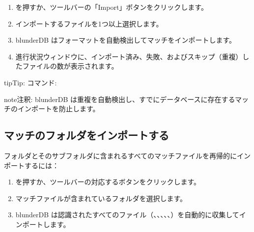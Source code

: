 \documentclass[letterpaper,10pt,dvipdfmx]{sphinxmanual}
\begin{document}
\sphinxAtStartPar
{}
\begin{enumerate}
%
\item {} 
\sphinxAtStartPar
{} を押すか、ツールバーの「Import」ボタンをクリックします。

\item {} 
\sphinxAtStartPar
インポートするファイルを1つ以上選択します。

\item {} 
\sphinxAtStartPar
blunderDB はフォーマットを自動検出してマッチをインポートします。

\item {} 
\sphinxAtStartPar
進行状況ウィンドウに、インポート済み、失敗、およびスキップ（重複）したファイルの数が表示されます。

\end{enumerate}

\begin{sphinxadmonition}{tip}{Tip:}
\sphinxAtStartPar
コマンド: 
\end{sphinxadmonition}

\begin{sphinxadmonition}{note}{注釈:}
\sphinxAtStartPar
blunderDB は重複を自動検出し、すでにデータベースに存在するマッチのインポートを防止します。
\end{sphinxadmonition}


\subsection{マッチのフォルダをインポートする}
\label{\detokenize{guide_utilisateur:importer-un-dossier-de-matchs}}
\sphinxAtStartPar
フォルダとそのサブフォルダに含まれるすべてのマッチファイルを再帰的にインポートするには：
\begin{enumerate}
%
\item {} 
\sphinxAtStartPar
{} を押すか、ツールバーの対応するボタンをクリックします。

\item {} 
\sphinxAtStartPar
マッチファイルが含まれているフォルダを選択します。

\item {} 
\sphinxAtStartPar
blunderDB は認識されたすべてのファイル（、、、、、）を自動的に収集してインポートします。

\end{enumerate}
\end{document}
